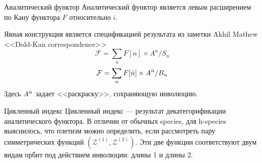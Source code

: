 \documentclass{beamer}
\begin{document}
\begin{frame}{Аналитический функтор}
Аналитический функтор является левым расширением по Кану функтора $F$
относительно $i$.
\begin{center}
\end{center}
Явная конструкция является спецификацией результата из заметки Akhil Mathew
<<Dold-Kan correspondence>>
\begin{equation}
\mathcal F = \sum\limits_n F[n] \times A^{n} / S_n
\end{equation}               
\begin{equation}
\mathcal F = \sum\limits_n F[\Bar n] \times A^{\Bar n} / B_n
\end{equation}
Здесь $A^{\Bar n}$ задает <<раскраску>>, сохраняющую инволюцию.
\end{frame}

\begin{frame}{Цикленный индекс}
Цикленный индекс --- результат декатегорификации аналитического функтора.
В отличии от обычных species, для h-species выяснилось, что плетизм можно
определить, если рассмотреть пару симметрических функций
$(\mathcal Z^{(1)}, \mathcal Z^{(2)})$. Эти две функции соответствуют двум
видам орбит под действием инволюции: длины 1 и длины 2.
\end{frame}
\end{document}
